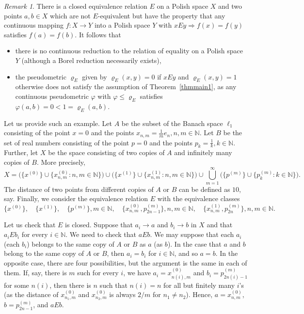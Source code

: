 \documentclass[a4paper]{amsart}
\theoremstyle{plain}
\theoremstyle{remark}
\newtheorem{remark}[theorem]{Remark}
\begin{document}
\begin{remark}
There is a closed equivalence relation $ E $ on a Polish space $ X $ and two points $ a, b \in X $ which are not $ E $-equivalent but have the property that any continuous mapping $ f : X \to Y $ into a Polish space $ Y $ with $ x E y \Rightarrow f(x) = f(y) $ satisfies $ f(a) = f(b) $. It follows that
\begin{itemize}
\item there is no continuous reduction to the relation of equality on a Polish space $ Y $ (although a Borel reduction necessarily exists),
\item the pseudometric $ \varrho_{E} $ given by $ \varrho_{E}(x, y) = 0 $ if $ x E y $ and $ \varrho_{E}(x, y) = 1 $ otherwise does not satisfy the assumption of Theorem~\ref{thmmain1}, as any continuous pseudometric $ \varphi $ with $ \varphi \leq \varrho_{E} $ satisfies $ \varphi(a, b) = 0 < 1 = \varrho_{E}(a, b) $.
\end{itemize}

Let us provide such an example. Let $ A $ be the subset of the Banach space $ \ell_{1} $ consisting of the point $ x = 0 $ and the points $ x_{n, m} = \frac{1}{m} e_{n}, n, m \in \mathbb{N} $. Let $ B $ be the set of real numbers consisting of the point $ p = 0 $ and the points $ p_{k} = \frac{1}{k}, k \in \mathbb{N} $. Further, let $ X $ be the space consisting of two copies of $ A $ and infinitely many copies of $ B $. More precisely,
$$ X = \big( \{ x^{(0)} \} \cup \{ x^{(0)}_{n, m} : n, m \in \mathbb{N} \} \big) \cup \big( \{ x^{(1)} \} \cup \{ x^{(1)}_{n, m} : n, m \in \mathbb{N} \} \big) \cup \bigcup_{m=1}^{\infty} \big( \{ p^{(m)} \} \cup \{ p^{(m)}_{k} : k \in \mathbb{N} \} \big). $$
The distance of two points from different copies of $ A $ or $ B $ can be defined as $ 10 $, say. Finally, we consider the equivalence relation $ E $ with the equivalence classes
$$ \{ x^{(0)} \}, \quad \{ x^{(1)} \}, \quad \{ p^{(m)} \}, m \in \mathbb{N}, \quad \{ x^{(0)}_{n, m}, p^{(m)}_{2n-1} \}, n, m \in \mathbb{N}, \quad \{ x^{(1)}_{n, m}, p^{(m)}_{2n} \}, n, m \in \mathbb{N}. $$

Let us check that $ E $ is closed. Suppose that $ a_{i} \to a $ and $ b_{i} \to b $ in $ X $ and that $ a_{i} E b_{i} $ for every $ i \in \mathbb{N} $. We need to check that $ a E b $. We may suppose that each $ a_{i} $ (each $ b_{i} $) belongs to the same copy of $ A $ or $ B $ as $ a $ (as $ b $). In the case that $ a $ and $ b $ belong to the same copy of $ A $ or $ B $, then $ a_{i} = b_{i} $ for $ i \in \mathbb{N} $, and so $ a = b $. In the opposite case, there are four possibilities, but the argument is the same in each of them. If, say, there is $ m $ such for every $ i $, we have $ a_{i} = x^{(0)}_{n(i), m} $ and $ b_{i} = p^{(m)}_{2n(i)-1} $ for some $ n(i) $, then there is $ n $ such that $ n(i) = n $ for all but finitely many $ i $'s (as the distance of $ x^{(0)}_{n_{1}, m} $ and $ x^{(0)}_{n_{2}, m} $ is always $ 2/m $ for $ n_{1} \neq n_{2} $). Hence, $ a = x^{(0)}_{n, m} $, $ b = p^{(m)}_{2n-1} $, and $ a E b $.


\end{remark}
\end{document}
